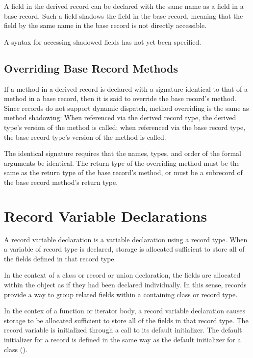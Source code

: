 A field in the derived record can be declared with the same name as a
field in a base record.  Such a field shadows the field in the base
record, meaning that the field by the same name in the base record is not
directly accessible.

\begin{openissue}
A syntax for accessing shadowed fields has not yet been specified.
\end{openissue}

\subsection{Overriding Base Record Methods}
\label{Overriding_Base_Record_Methods}

If a method in a derived record is declared with a signature identical to that
of a method in a base record, then it is said to override the
base record's method.  Since records do not support dynamic dispatch, method
overriding is the same as method shadowing: When referenced via the derived
record type, the derived type's version of the method is called; when referenced
via the base record type, the base record type's version of the method is called.

The identical signature requires that the names, types, and order of
the formal arguments be identical. The return type of the overriding
method must be the same as the return type of the base record's method,
or must be a subrecord of the base record method's return type.

\section{Record Variable Declarations}
\label{Record_Variable_Declarations}

A record variable declaration is a variable declaration using a record type.
When a variable of record type is declared, storage is allocated sufficient to
store all of the fields defined in that record type.  

In the context of a class or record or union declaration, the fields are
allocated within the object as if they had been declared individually.  In this
sense, records provide a way to group related fields within a containing class
or record type. 

In the contex of a function or iterator body, a record variable declaration
causes storage to be allocated sufficient to store all of the fields in that
record type.  The record variable is initialized through a call to its
default initializer.  The default initializer for a record is defined in the
same way as the default initializer for a class ().

